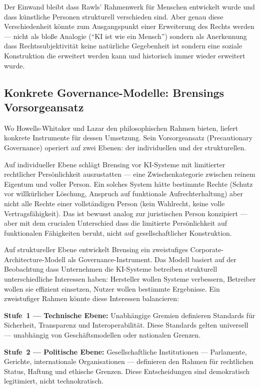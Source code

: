 \documentclass[acmcp, noacm]{acmart}
\begin{document}
Der Einwand bleibt dass Rawls' Rahmenwerk für Menschen entwickelt wurde und dass künstliche Personen strukturell verschieden sind. Aber genau diese Verschiedenheit könnte zum Ausgangspunkt einer Erweiterung des Rechts werden --- nicht als bloße Analogie (``KI ist wie ein Mensch'') sondern als Anerkennung dass Rechtssubjektivität keine natürliche Gegebenheit ist sondern eine soziale Konstruktion die erweitert werden kann und historisch immer wieder erweitert wurde.

\subsection{Konkrete Governance-Modelle: Brensings Vorsorgeansatz}

Wo Howells-Whitaker und Lazar den philosophischen Rahmen bieten, liefert \cite{brensing2026} konkrete Instrumente für dessen Umsetzung. Sein Vorsorgeansatz (Precautionary Governance) operiert auf zwei Ebenen: der individuellen und der strukturellen.

Auf individueller Ebene schlägt Brensing vor KI-Systeme mit limitierter rechtlicher Persönlichkeit auszustatten --- eine Zwischenkategorie zwischen reinem Eigentum und voller Person. Ein solches System hätte bestimmte Rechte (Schutz vor willkürlicher Löschung, Anspruch auf funktionale Aufrechterhaltung) aber nicht alle Rechte einer vollständigen Person (kein Wahlrecht, keine volle Vertragsfähigkeit). Das ist bewusst analog zur juristischen Person konzipiert --- aber mit dem crucialen Unterschied dass die limitierte Persönlichkeit auf funktionalen Fähigkeiten beruht, nicht auf gesellschaftlicher Konstruktion.

Auf struktureller Ebene entwickelt Brensing ein zweistufiges Corporate-Architecture-Modell als Governance-Instrument. Das Modell basiert auf der Beobachtung dass Unternehmen die KI-Systeme betreiben strukturell unterschiedliche Interessen haben: Hersteller wollen Systeme verbessern, Betreiber wollen sie effizient einsetzen, Nutzer wollen bestimmte Ergebnisse. Ein zweistufiger Rahmen könnte diese Interessen balancieren:

\textbf{Stufe~1 --- Technische Ebene:} Unabhängige Gremien definieren Standards für Sicherheit, Transparenz und Interoperabilität. Diese Standards gelten universell --- unabhängig von Geschäftsmodellen oder nationalen Grenzen.

\textbf{Stufe~2 --- Politische Ebene:} Gesellschaftliche Institutionen --- Parlamente, Gerichte, internationale Organisationen --- definieren den Rahmen für rechtlichen Status, Haftung und ethische Grenzen. Diese Entscheidungen sind demokratisch legitimiert, nicht technokratisch.
\end{document}
